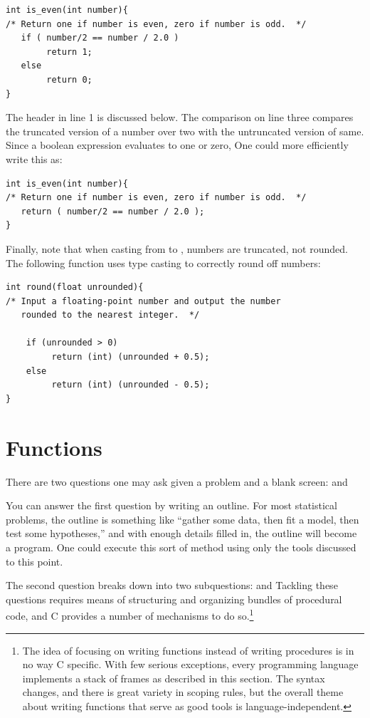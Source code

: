 \documentclass[12pt]{article}
\begin{document}
\lstset{numbers=left, numberstyle=\scshape}\label{isevenfn}
\begin{lstlisting}
int is_even(int number){
/* Return one if number is even, zero if number is odd.  */
   if ( number/2 == number / 2.0 )
        return 1;
   else 
        return 0;
}
\end{lstlisting}
The header in line 1 is discussed below. The comparison on line three
compares the truncated version of a number over two with the untruncated
version of same.
Since a boolean expression evaluates to one or zero,
One could more efficiently write this as:
\begin{lstlisting}
int is_even(int number){
/* Return one if number is even, zero if number is odd.  */
   return ( number/2 == number / 2.0 );
}
\end{lstlisting}

Finally, note that when casting from  to , numbers
are truncated, not rounded.  The following function uses type casting
to correctly round off numbers:

\begin{lstlisting}
int round(float unrounded){
/* Input a floating-point number and output the number
   rounded to the nearest integer.  */

    if (unrounded > 0)
         return (int) (unrounded + 0.5);
    else
         return (int) (unrounded - 0.5);
}
\end{lstlisting}
\lstset{numbers=none}



\section{Functions} \label{functional}

There are two questions one may ask given a problem and a blank screen:
 and 

You can answer the first question by writing an outline. For most
statistical problems, the outline is something like ``gather some data,
then fit a model, then test some hypotheses,'' and with enough details
filled in, the outline will become a program. One could execute this
sort of method using only the tools discussed to this point.

The second question breaks down into two subquestions:  and 
Tackling these questions requires means of structuring and organizing
bundles of procedural code, and C provides a number of mechanisms to
do so.\footnote{The idea of focusing on writing functions instead of
writing procedures is in no way C specific. With few serious exceptions,
every programming language implements a stack of frames as described in
this section. The syntax changes, and there is great variety in 
scoping rules, but the overall theme about writing functions that
serve as good tools is language-independent.}
\end{document}
